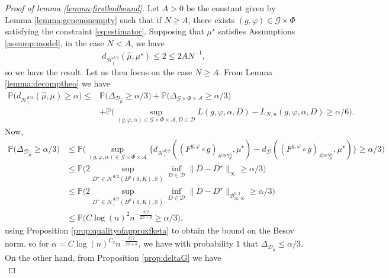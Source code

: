 \documentclass[10pt]{article}
\begin{document}
\begin{proof}[Proof of lemma \ref{lemma:firstbadbound}]
Let $A>0$ be the constant given by Lemma \ref{lemma:genenonempty} such that if $N\geq A$, there exists $(g,\varphi)\in \mathcal{G}\times  \Phi$ satisfying the constraint \eqref{eq:estimator}. Supposing that $\mu^\star$ satisfies Assumptions  \ref{assump:model}, in the case $N<A$, we have 
\begin{align}\label{align:trivresult}
    d_{\mathcal{H}^{d/2}_1}(\hat{\mu},\mu^\star)\leq 2 \leq 2AN^{-1},
\end{align}
so we have the result. Let us then focus on the case $N\geq A$. From Lemma \ref{lemma:decomptheo} we have
\begin{align*}
    \mathbb{P}\Big(d_{\mathcal{H}^{d/2}_1}(\hat{\mu},\mu)\geq \alpha \Big)\leq& \mathbb{P}\Big(\Delta_{\mathcal{D}_{\hat{\mu}}}\geq \alpha/3 \Big)+\mathbb{P}\Big(\Delta_{\mathcal{G}\times \Phi \times \mathcal{A}}\geq \alpha/3 \Big)\\    &+\mathbb{P}\Big(\sup_{(g,\varphi,\alpha)\in \mathcal{G}\times  \Phi\times \mathcal{A},D\in \mathcal{D}} L(g,\varphi,\alpha,D)-L_{N,n}(g,\varphi,\alpha,D)\geq  \alpha/6 \Big).
\end{align*}
Now,
\begin{align*}
    \mathbb{P}\Big(\Delta_{\mathcal{D}_{\hat{\mu}}}\geq \alpha/3 \Big)& \leq \mathbb{P}\Big(\sup \limits_{(g,\varphi,\alpha)\in \mathcal{G}\times  \Phi\times \mathcal{A}} \bigl\{ d_{\mathcal{H}_1^{d/2}}((F^{g,\varphi}\circ g)_{\# \alpha \gamma_d^n},\mu^\star)-d_{\mathcal{D}}((F^{g,\varphi}\circ g)_{\# \alpha \gamma_d^n},\mu^\star)\bigl\}\geq \alpha/3 \Big)\\
    & \leq \mathbb{P}\Big(2\sup_{D^\star\in \mathcal{H}_1^{d/2}(B^p(0,K),\mathbb{R})} \inf\limits_{D\in \mathcal{D}} \|D-D^\star\|_\infty\geq \alpha/3 \Big)\\
    & \leq \mathbb{P}\Big(2\sup_{D^\star\in \mathcal{H}_1^{d/2}(B^p(0,K),\mathbb{R})} \inf\limits_{D\in \mathcal{D}} \|D-D^\star\|_{\mathcal{B}^{0,2}_{\infty,\infty}}\geq \alpha/3 \Big)\\
    & \leq \mathbb{P}\Big( C \log(n)^2 n^{-\frac{d/2}{2\beta+d}}\geq \alpha/3 \Big),
\end{align*}
using Proposition \ref{prop:qualityofapproxfketa} to obtain the bound on the Besov norm. so for $\alpha=C\log(n)^{C_2} n^{-\frac{d/2}{2\beta+d}}$, we have with probability $1$ that $\Delta_{\mathcal{D}_{\hat{\mu}}}\leq \alpha/3$. On the other hand, from Proposition \ref{prop:deltaG} we have 
\begin{equation}\label{eq:approxGprecise}

\end{equation}
\end{proof}
\end{document}
